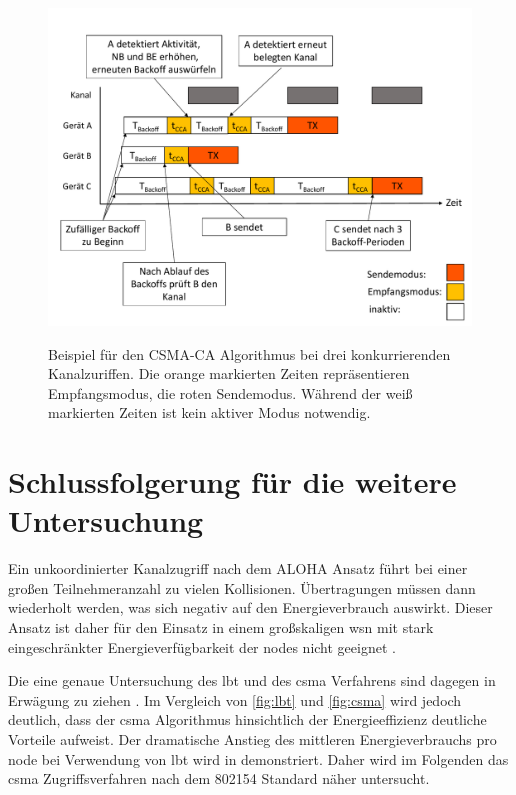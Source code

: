 \begin{figure}[bth]
        \myfloatalign
        {\includegraphics[width=1\linewidth]{gfx/CSMA}} 
        \caption[Carrier Sense Multiple Access]{Beispiel für den CSMA-CA Algorithmus bei drei konkurrierenden Kanalzuriffen. Die orange markierten Zeiten repräsentieren Empfangsmodus, die roten Sendemodus. Während der weiß markierten Zeiten ist kein aktiver Modus notwendig. }\label{fig:csma}
\end{figure}

\section{Schlussfolgerung für die weitere Untersuchung}

Ein unkoordinierter Kanalzugriff nach dem ALOHA Ansatz führt bei einer großen Teilnehmeranzahl zu vielen Kollisionen. Übertragungen müssen dann wiederholt werden, was sich negativ auf den Energieverbrauch auswirkt. Dieser Ansatz ist daher für den Einsatz in einem großskaligen \acs{wsn} mit stark eingeschränkter Energieverfügbarkeit der \glspl{node} nicht geeignet \cite{inBinTestbed}. 

Die eine genaue Untersuchung des \acs{lbt} und des \acs{csma} Verfahrens sind dagegen in Erwägung zu ziehen \cite{Falkenberg2017b}\citep{GreenOrbs}. Im Vergleich von \autoref{fig:lbt} und \autoref{fig:csma} wird jedoch deutlich, dass der \acs{csma} Algorithmus hinsichtlich der Energieeffizienz deutliche Vorteile aufweist. Der dramatische Anstieg des mittleren Energieverbrauchs pro \gls{node} bei Verwendung von \acs{lbt} wird in \citep{Falkenberg2017b} demonstriert.
Daher wird im Folgenden das \acs{csma} Zugriffsverfahren nach dem \gls{802154} Standard näher untersucht. 





